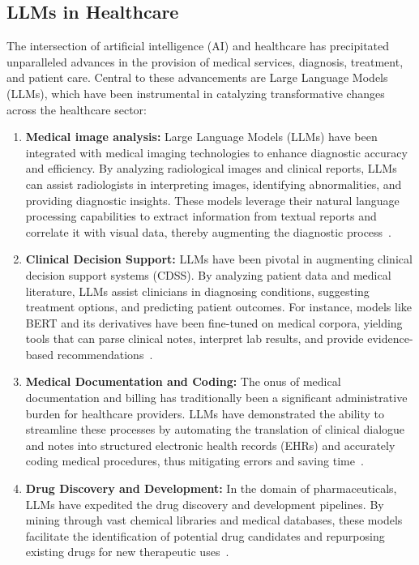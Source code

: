 \subsection{LLMs in Healthcare}
\label{subsec:llms-in-healthcare}

The intersection of artificial intelligence (AI) and healthcare has precipitated unparalleled advances in the provision of medical services, diagnosis, treatment, and patient care.
Central to these advancements are Large Language Models (LLMs), which have been instrumental in catalyzing transformative changes across the healthcare sector:

\begin{enumerate}
	\item \textbf{Medical image analysis:}{
		      Large Language Models (LLMs) have been integrated with medical imaging technologies to enhance diagnostic accuracy and efficiency.
		      By analyzing radiological images and clinical reports, LLMs can assist radiologists in interpreting images, identifying abnormalities, and providing diagnostic insights.
		      These models leverage their natural language processing capabilities to extract information from textual reports and correlate it with visual data, thereby augmenting the diagnostic process~\cite{li2021survey, zhang2021medical}.
	      }

	\item \textbf{Clinical Decision Support:}{
		      LLMs have been pivotal in augmenting clinical decision support systems (CDSS). By analyzing patient data and medical literature, LLMs assist clinicians in diagnosing conditions, suggesting treatment options, and predicting patient outcomes. For instance, models like BERT and its derivatives have been fine-tuned on medical corpora, yielding tools that can parse clinical notes, interpret lab results, and provide evidence-based recommendations~\cite{alsentzer2019publicly}.
	      }

	\item \textbf{Medical Documentation and Coding:}{
		      The onus of medical documentation and billing has traditionally been a significant administrative burden for healthcare providers. LLMs have demonstrated the ability to streamline these processes by automating the translation of clinical dialogue and notes into structured electronic health records (EHRs) and accurately coding medical procedures, thus mitigating errors and saving time~\cite{shickel2018deep}.
	      }

	\item \textbf{Drug Discovery and Development:}{
		      In the domain of pharmaceuticals, LLMs have expedited the drug discovery and development pipelines. By mining through vast chemical libraries and medical databases, these models facilitate the identification of potential drug candidates and repurposing existing drugs for new therapeutic uses~\cite{zhavoronkov2019deep}.
	      }


\end{enumerate}
